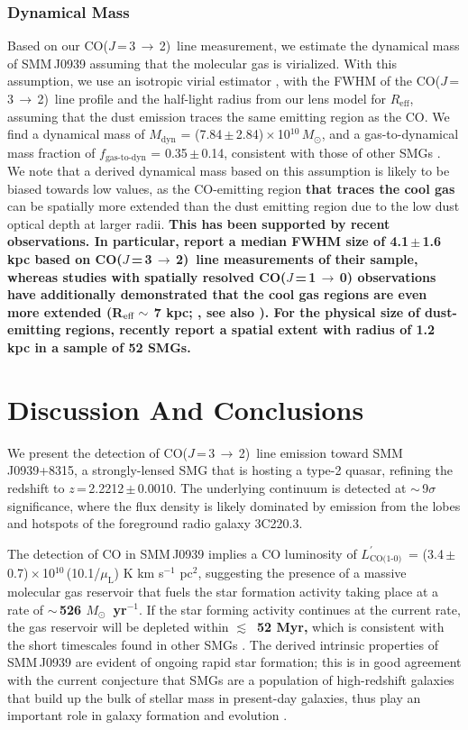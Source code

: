 \documentclass[iop, revtex4]{emulateapj}
\newcommand{\Msun}{\mbox{$M_{\odot}$}}
\newcommand{\rarr}{$\rightarrow$}
\newcommand{\CO}{\mbox{CO($J$\,=\,3\,$\rightarrow$\,2) }}
\newcommand{\rot}[3][CO]{\mbox{#1($J$\,=\,#2\,\rarr\,#3)}}
\newcommand{\Lp}{\mbox{$L^{\prime}_\textrm{CO(1-0)}$}}
\newcommand{\LpU}{\mbox{K\,\,km\,\,s$^{-1}$\,\,pc$^2$}}
\newcommand{\eg}{{\sl e.g.,~}}
\newcommand{\pmOne}{\mbox{$^{-1}$}}
\begin{document}
\subsubsection{Dynamical Mass}
Based on our \CO line measurement, we estimate the dynamical mass of SMM\,J0939 assuming that the molecular gas is virialized. With this assumption, we use an isotropic virial estimator \citep[\eg][]{Engel10a}, with the FWHM of the \CO line profile and the half-light radius from our lens model for $R_\textrm{eff}$, assuming that the dust emission traces the same emitting region as the CO. 
We find a dynamical mass of $M_\textrm{dyn}$ = (7.84\,$\pm$\,2.84)\,$\times$\,10$^{10}$\,\Msun, and a gas-to-dynamical mass fraction of $f_\textrm{gas-to-dyn}$ = 0.35\,$\pm$\,0.14, consistent with those of other SMGs \citep{Tacconi06a}.  We note that a derived dynamical mass based on this assumption is likely to be biased towards low values, as the CO-emitting region {\bf that traces the cool gas} can be spatially more extended than the dust emitting region due to the low dust optical depth at larger radii. %
{\bf This has been supported by recent observations. In particular, \citet{Tacconi06a} report a median FWHM size of 4.1\,$\pm$\,1.6 kpc based on \CO line measurements of their sample, whereas studies with spatially resolved \rot{1}{0} observations have additionally demonstrated that the cool gas regions are even more extended (R$_{\rm eff} \sim$ 7 kpc;  \citealt{Ivison11a}, see also \citealt{Riechers11c, Hodge13a}). 
For the physical size of dust-emitting regions, \citet{Simpson15a} recently report a spatial extent with radius of 1.2 kpc in a sample of 52 SMGs.
 }

\section{Discussion And Conclusions}
We present the detection of \CO line emission toward SMM\,J0939+8315, a strongly-lensed SMG that is hosting a type-2 quasar, refining the redshift
to $z$\,=\,2.2212\,$\pm$\,0.0010. The underlying continuum is detected at $\sim$\,9$\sigma$ significance, where the flux density is likely dominated by emission from the lobes and hotspots of the foreground radio galaxy 3C220.3.

The detection of CO in SMM\,J0939
implies a CO luminosity of \Lp\ = (3.4\,$\pm$\,0.7)\,$\times$\,10$^{10}$\,(10.1/$\mu_\textrm{L}$) \LpU, suggesting the presence of a massive
molecular gas reservoir that fuels the star formation activity taking place at a rate of {\bf $\sim$\,526 \Msun~yr\pmOne}. If the star forming activity continues at the current rate, the gas reservoir will be depleted within {\bf $\lesssim$~52 Myr,}
which is consistent with the short timescales found in other SMGs \citep{Greve05a}. The derived intrinsic properties of SMM\,J0939 are evident of ongoing rapid star formation; this is in good agreement with the current conjecture that SMGs are a 
population of high-redshift galaxies that build up the bulk of stellar mass in present-day galaxies, thus play an important role
in galaxy formation and evolution \citep[\eg ][]{Dickinson03a}.
\end{document}
